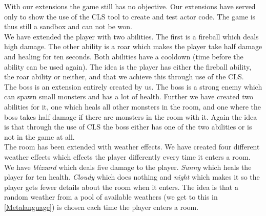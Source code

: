 With our extensions the game still has no objective. Our extensions have served only to show the use of the CLS tool to create and test actor code. The game is thus still a sandbox and can not be won.\\
We have extended the player with two abilities. The first is a fireball which deals high damage. The other ability is a roar which makes the player take half damage and healing for ten seconds. Both abilities have a cooldown (time before the ability can be used again). The idea is the player has either the fireball ability, the roar ability or neither, and that we achieve this through use of the CLS.\\
The boss is an extension entirely created by us. The boss is a strong enemy which can spawn small monsters and has a lot of health. Further we have created two abilities for it, one which heals all other monsters in the room, and one where the boss takes half damage if there are monsters in the room with it. Again the idea is that through the use of CLS the boss either has one of the two abilities or is not in the game at all.\\
The room has been extended with weather effects. We have created four different weather effects which effects the player differently every time it enters a room. We have \textit{blizzard} which deals five damage to the player. \textit{Sunny} which heals the player for ten health. \textit{Cloudy} which does nothing and \textit{night} which makes it so the player gets fewer details about the room when it enters. The idea is that a random weather from a pool of available weathers (we get to this in \autoref{Metalanguage}) is chosen each time the player enters a room.\\

